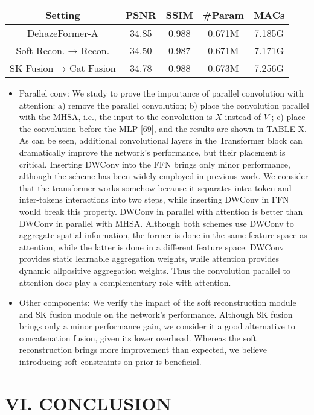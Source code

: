 \documentclass{article}
\begin{document}
\begin{tabular}{|c|c|c|c|c|}\hline
Setting & PSNR & SSIM & #Param & MACs \\ \hline
DehazeFormer-A & 34.85 & 0.988 & 0.671M & 7.185G \\ \hline
Soft Recon. → Recon. & 34.50 & 0.987 & 0.671M & 7.171G \\ \hline
SK Fusion → Cat Fusion & 34.78 & 0.988 & 0.673M & 7.256G \\ \hline
\end{tabular}
\begin{itemize}
\item Parallel conv: We study to prove the importance of parallel convolution with attention: a) remove the parallel convolution; b) place the convolution parallel with the MHSA, i.e., the input to the convolution is $X$ instead of $V$ ; c) place the convolution before the MLP [69], and the results are shown in TABLE X. As can be seen, additional convolutional layers in the Transformer block can dramatically improve the network’s performance, but their placement is critical. Inserting DWConv into the FFN brings only minor performance, although the scheme has been widely employed in previous work. We consider that the transformer works somehow because it separates intra-token and inter-tokens interactions into two steps, while inserting DWConv in FFN would break this property. DWConv in parallel with attention is better than DWConv in parallel with MHSA. Although both schemes use DWConv to aggregate spatial information, the former is done in the same feature space as attention, while the latter is done in a different feature space. DWConv provides static learnable aggregation weights, while attention provides dynamic allpositive aggregation weights. Thus the convolution parallel to attention does play a complementary role with attention.


\item Other components: We verify the impact of the soft reconstruction module and SK fusion module on the network’s performance. Although SK fusion brings only a minor performance gain, we consider it a good alternative to concatenation fusion, given its lower overhead. Whereas the soft reconstruction brings more improvement than expected, we believe introducing soft constraints on prior is beneficial.


\end{itemize}

\section{VI. CONCLUSION}
\end{document}
